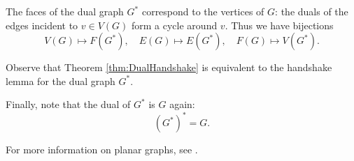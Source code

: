 
The faces of the dual graph $G^*$ correspond to the vertices of $G$:
the duals of the edges incident to $v \in V(G)$ form a cycle around $v$.
Thus we have bijections
\[
V(G) \mapsto F(G^*), \quad E(G) \mapsto E(G^*), \quad F(G) \mapsto V(G^*).
\]

Observe that Theorem \ref{thm:DualHandshake} is equivalent to the handshake lemma for the dual graph $G^*$.

Finally, note that the dual of $G^*$ is $G$ again:
\[
(G^*)^* = G.
\]

\bigskip

For more information on planar graphs, see \cite[Chapter 10]{BM}.



